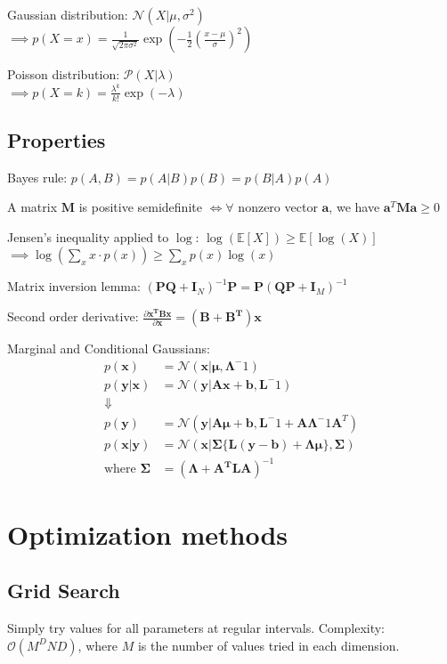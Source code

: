\documentclass[10pt,a4paper,landscape]{article}
\providecommand{\bf}[1]{\ensuremath{\mathbf{#1}}}
\begin{document}
\begin{multicols*}{4}
Gaussian distribution: $\mathcal{N}(X| \mu, \sigma^2)$ \\
$\implies p(X = x) = \frac{1}{\sqrt{2 \pi \sigma^2}} \exp{(- \frac{1}{2} ( \frac{x - \mu}{\sigma} )^2)}$

Poisson distribution: $\mathcal{P}(X| \lambda)$ \\
$\implies p(X = k) = \frac{\lambda ^ k}{k!} \exp{(- \lambda)}$

\subsection{Properties}
Bayes rule: $p(A, B) = p(A|B) p(B) = p(B|A) p(A)$

A matrix $\bf{M}$ is positive semidefinite $\iff \forall$ nonzero vector $\bf{a}$, we have $\bf{a}^T \bf{M} \bf{a} \geq 0$

Jensen's inequality applied to $\log$: $\log( \mathbb{E}[X] ) \geq \mathbb{E}[\log(X)]$ \\
$\implies \log ( \sum_x x \cdot p(x) ) \geq \sum_x p(x) \log(x)$

Matrix inversion lemma: $(\bf{PQ} + \bf{I}_N)^{-1} \bf{P} = \bf{P}(\bf{QP} + \bf{I}_M)^{-1}$

Second order derivative: $\frac{\partial \bf{x^T B x}}{\partial \bf{x}} = (\bf{B + B^T}) \bf{x}$

Marginal and Conditional Gaussians:
$$
\begin{aligned}
p(\bf{x}) &= \mathcal{N}(\bf{x} | \boldsymbol\mu, \boldsymbol\Lambda^-1) \\
p(\bf{y}|\bf{x}) &= \mathcal{N}(\bf{y} | \bf{Ax + b, L}^-1) \\
\Downarrow \\
p(\bf{y}) &= \mathcal{N}(\bf{y} | \bf{A} \boldsymbol\mu + \bf{b}, \bf{L}^-1 + \bf{A} \boldsymbol\Lambda^-1 \bf{A}^T)	\\
p(\bf{x}|\bf{y}) &= \mathcal{N}(\bf{x} |\boldsymbol\Sigma \{ \bf{L(y - b) + \Lambda \mu} \}, \boldsymbol\Sigma) \\
\text{where } \boldsymbol\Sigma &= (\boldsymbol\Lambda + \bf{A^T L A})^{-1}
\end{aligned}
$$

\section{Optimization methods}

\subsection{Grid Search}
Simply try values for all parameters at regular intervals.
Complexity: $\mathcal{O}(M^D N D)$, where $M$ is the number of values tried in each dimension.


\end{multicols*}
\end{document}
